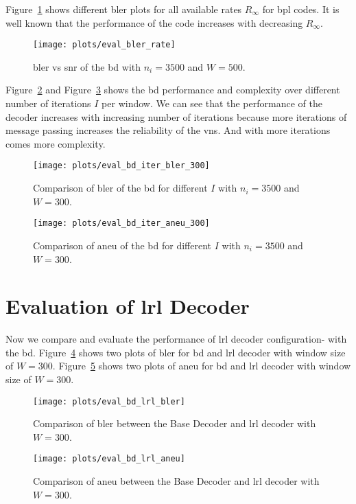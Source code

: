 Figure~\ref{fig:eval_bler_rate} shows different \gls{bler} plots for all available rates $R_\infty$ for \gls{bpl} codes. It is well known that the performance of the code increases with decreasing $R_\infty$.
\begin{figure}[htbp]
  \centering
  \texttt{[image: plots/eval\_bler\_rate]}
  \caption{\gls{bler} vs \gls{snr} of the \acrfull{bd} with $n_i=3500$ and $W=500$.}
  \label{fig:eval_bler_rate}
\end{figure}

Figure~\ref{fig:eval_bd_iter_bler_300} and Figure~\ref{fig:eval_bd_iter_aneu_300} shows the \gls{bd} performance and complexity over different number of iterations $I$ per window. We can see that the performance of the decoder increases with increasing number of iterations because more iterations of message passing increases the reliability of the \glspl{vn}. And with more iterations comes more complexity.
\begin{figure}[htbp]
  \centering
  \texttt{[image: plots/eval\_bd\_iter\_bler\_300]}
  \caption{Comparison of \gls{bler} of the \acrfull{bd} for different $I$ with $n_i=3500$ and $W=300$.}
  \label{fig:eval_bd_iter_bler_300}
\end{figure}
\begin{figure}[htbp]
  \centering
  \texttt{[image: plots/eval\_bd\_iter\_aneu\_300]}
  \caption{Comparison of \gls{aneu} of the \acrfull{bd} for different $I$ with $n_i=3500$ and $W=300$.}
  \label{fig:eval_bd_iter_aneu_300}
\end{figure}

\section{Evaluation of \acrfull{lrl} Decoder}
Now we compare and evaluate the performance of \gls{lrl} decoder configuration- with the \gls{bd}. Figure~\ref{fig:eval_bd_lrl_bler} shows two plots of \gls{bler} for \gls{bd} and \gls{lrl} decoder with window size of $W=300$. Figure~\ref{fig:eval_bd_lrl_aneu} shows two plots of \gls{aneu} for \gls{bd} and \gls{lrl} decoder with window size of $W=300$.
\begin{figure}[htbp]
  \centering
  \texttt{[image: plots/eval\_bd\_lrl\_bler]}
  \caption{Comparison of \gls{bler} between the Base Decoder and \gls{lrl} decoder with $W=300$.}
  \label{fig:eval_bd_lrl_bler}
\end{figure}
\begin{figure}[htbp]
  \centering
  \texttt{[image: plots/eval\_bd\_lrl\_aneu]}
  \caption{Comparison of \gls{aneu} between the Base Decoder and \gls{lrl} decoder with $W=300$.}
  \label{fig:eval_bd_lrl_aneu}
\end{figure}

